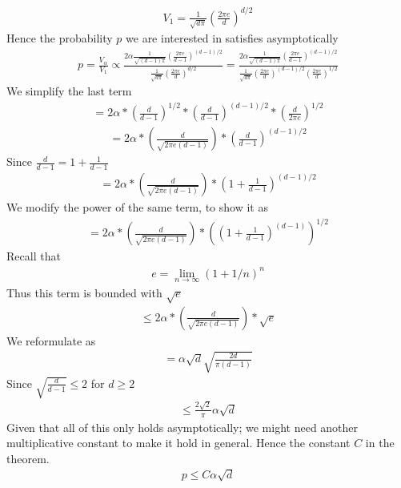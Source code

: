 \documentclass[a4paper, english, headtopline=0.08em, headsepline=0.04em, left = 1cm, right = 1cm, DIV=15]{article}
\begin{document}
\begin{align*}
	V_1 = \frac{1}{\sqrt{d\pi}}\left(\frac{2 \pi e}{d}\right)^{d/2}
\end{align*}
Hence the probability $p$ we are interested in satisfies asymptotically
\begin{align*}
	p=\frac{V_\alpha}{V_1} \propto
\frac{2\alpha\frac{1}{\sqrt{(d-1)\pi}}\left(\frac{2 \pi e}{d-1}\right)^{(d-1)/2}}
 {\frac{1}{\sqrt{d\pi}}\left(\frac{2 \pi e}{d}\right)^{d/2}}
=
\frac{2\alpha\frac{1}{\sqrt{(d-1)\pi}}\left(\frac{2 \pi e}{d-1}\right)^{(d-1)/2}}
{\frac{1}{\sqrt{d\pi}}\left(\frac{2 \pi e}{d}\right)^{(d-1)/2}\left(\frac{2 \pi e}{d}\right)^{1/2}}
\end{align*}
We simplify the last term
\begin{align*}
	=2\alpha* \left(\frac{d}{d-1}\right)^{1/2} *   \left(\frac{d}{d-1}\right)^{(d-1)/2} * \left(\frac{d}{2\pi e}\right)^{1/2}
\end{align*}
\begin{align*}
	=2\alpha*  \left(\frac{d}{\sqrt{2\pi e (d-1)}}\right) *   \left(\frac{d}{d-1}\right)^{(d-1)/2}
\end{align*}
 Since $\frac{d}{d-1} = 1+\frac{1}{d-1}$
\begin{align*}
	=2\alpha*  \left(\frac{d}{\sqrt{2\pi e (d-1)}}\right) *   \left(1+\frac{1}{d-1}\right)^{(d-1)/2}
\end{align*}
We modify the power of the same term, to show it as
\begin{align*}
	=2\alpha*  \left(\frac{d}{\sqrt{2\pi e (d-1)}}\right) *   \left(\left(1+\frac{1}{d-1}\right)^{(d-1)}\right)^{1/2}
\end{align*}
Recall that 
\begin{align*}
	e = \lim_{n \rightarrow \infty} \left(1+1/n\right)^n
\end{align*}
Thus this term is bounded with $\sqrt{e}$
\begin{align*}
	\leq 2\alpha*  \left(\frac{d}{\sqrt{2\pi e (d-1)}}\right) *   \sqrt{e}
\end{align*}
We reformulate as
\begin{align*}
	= \alpha \sqrt{d}\sqrt{\frac{2d}{\pi(d-1)}}
\end{align*}
Since $\sqrt{\frac{d}{d-1}}\leq 2$ for $d\geq 2$
\begin{align*}
	\leq \frac{2\sqrt{2}}{\pi}\alpha \sqrt{d} 
\end{align*}
Given that all of this only holds asymptotically; we might need another multiplicative constant to make it hold in general. Hence the constant $C$ in the theorem.
\begin{align*}
	p \leq  C\alpha \sqrt{d}
\end{align*}
\end{document}
